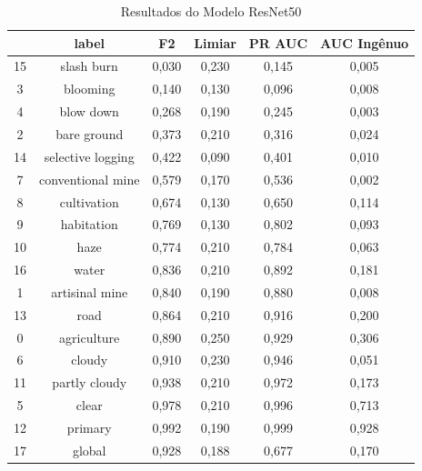 \begin{table}[h!]
    \caption{Resultados do Modelo ResNet50}
    \centering
\begin{tabular}{*{6}{c}}
    \toprule
    {} &              label &  F2    &  Limiar   &  PR AUC &  AUC Ingênuo \\
    \midrule
    15 &         slash burn &  0,030 &      0,230 &   0,145 &       0,005 \\
    3  &           blooming &  0,140 &      0,130 &   0,096 &       0,008 \\
    4  &          blow down &  0,268 &      0,190 &   0,245 &       0,003 \\
    2  &        bare ground &  0,373 &      0,210 &   0,316 &       0,024 \\
    14 &  selective logging &  0,422 &      0,090 &   0,401 &       0,010 \\
    7  &  conventional mine &  0,579 &      0,170 &   0,536 &       0,002 \\
    8  &        cultivation &  0,674 &      0,130 &   0,650 &       0,114 \\
    9  &         habitation &  0,769 &      0,130 &   0,802 &       0,093 \\
    10 &               haze &  0,774 &      0,210 &   0,784 &       0,063 \\
    16 &              water &  0,836 &      0,210 &   0,892 &       0,181 \\
    1  &     artisinal mine &  0,840 &      0,190 &   0,880 &       0,008 \\
    13 &               road &  0,864 &      0,210 &   0,916 &       0,200 \\
    0  &        agriculture &  0,890 &      0,250 &   0,929 &       0,306 \\
    6  &             cloudy &  0,910 &      0,230 &   0,946 &       0,051 \\
    11 &      partly cloudy &  0,938 &      0,210 &   0,972 &       0,173 \\
    5  &              clear &  0,978 &      0,210 &   0,996 &       0,713 \\
    12 &            primary &  0,992 &      0,190 &   0,999 &       0,928 \\
    17 &             global &  0,928 &      0,188 &   0,677 &       0,170 \\
    \bottomrule
\end{tabular}
\label{table:ResultadosResnet50}
\end{table}


